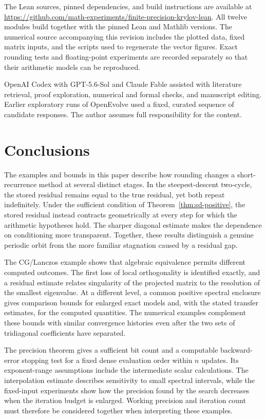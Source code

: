 \documentclass[11pt]{article}
\theoremstyle{definition}
\begin{document}
The Lean sources, pinned dependencies, and build instructions are available
at \url{https://github.com/math-experiments/finite-precision-krylov-lean}.
All twelve modules build together with the pinned Lean and Mathlib versions.
The numerical source accompanying this revision includes the plotted data,
fixed matrix inputs, and the scripts used to regenerate the vector figures.
Exact rounding tests and floating-point experiments are recorded separately
so that their arithmetic models can be reproduced.

OpenAI Codex with GPT-5.6-Sol and Claude Fable assisted with literature
retrieval, proof exploration, numerical and formal checks, and manuscript
editing. Earlier exploratory runs of OpenEvolve \cite{OpenEvolve} used a
fixed, curated sequence of candidate responses. The author assumes full
responsibility for the content.
\section{Conclusions}
\label{sec:conclusions}

The examples and bounds in this paper describe how rounding changes a
short-recurrence method at several distinct stages. In the steepest-descent
two-cycle, the stored residual remains equal to the true residual, yet both
repeat indefinitely. Under the sufficient condition of
Theorem~\ref{thm:sd-positive}, the stored residual instead contracts
geometrically at every step for which the arithmetic hypotheses hold.
The sharper diagonal estimate makes the dependence on conditioning more
transparent. Together, these results distinguish a genuine periodic orbit
from the more familiar stagnation caused by a residual gap.

The CG/Lanczos example shows that algebraic equivalence permits different
computed outcomes. The first loss of local orthogonality is identified
exactly, and a residual estimate relates singularity of the projected matrix
to the resolution of the smallest eigenvalue. At a different level, a common
positive spectral enclosure gives comparison bounds for enlarged exact
models and, with the stated transfer estimates, for the computed quantities.
The numerical examples complement these bounds with similar convergence
histories even after the two sets of tridiagonal coefficients have separated.

The precision theorem gives a sufficient bit count and a computable
backward-error stopping test for a fixed dense evaluation order within
$n$ updates. Its exponent-range assumptions include the intermediate scalar
calculations. The interpolation estimate describes sensitivity to small
spectral intervals, while the fixed-input experiments show how the precision
found by the search decreases when the iteration budget is enlarged.
Working precision and iteration count must therefore be considered together
when interpreting these examples.
\end{document}
